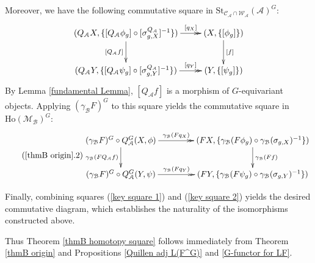 \documentclass[12pt,twoside]{amsart}
\theoremstyle{bfupright head,slanted body}
\theoremstyle{bfupright head,upright body}
\theoremstyle{fixed bf head,slanted body}
\theoremstyle{fixed bf head,upright body}
\theoremstyle{numbered paragraph}
\newenvironment{prf*}[1][Proof]{%
  \begin{proof}[\bf #1]
    \setcounter{equation}{0}
    \renewcommand{\theequation}{\arabic{equation}}}
  {\end{proof}
}
\numberwithin{equation}{res}
\newcommand{\calC}{\mathcal{C}}
\newcommand{\calW}{\mathcal{W}}
\newcommand{\calA}{\mathcal{A}}
\newcommand{\calB}{\mathcal{B}}
\newcommand{\calM}{\mathcal{M}}
\newcommand{\Ho}{\mathrm{Ho}}
\newcommand{\St}{\mathrm{St}}
\begin{document}
\begin{prf*}
Moreover, we have the following commutative square in $\St_{\calC_\calA \cap \calW_\calA}(\calA)^G$:
\[
\xymatrix{
   (Q_\calA X, \{[Q_\calA \phi_g] \circ [\sigma^{Q_\calA}_{g, X}]^{-1}\})
\ar[d]_{[Q_\calA f]}  \ar@{->>}[r]^-{[q_X]}
&  (X, \{[\phi_g]\})
\ar[d]^-{[f]}               \\
   (Q_\calA Y, \{[Q_\calA \psi_g] \circ [\sigma^{Q_\calA}_{g, Y}]^{-1}\})
\ar@{->>}[r]^-{[q_Y]}
&  (Y, \{[\psi_g]\})                                            }
\]
By Lemma \ref{fundamental Lemma}, $[Q_\calA f]$ is a morphism of $G$-equivariant objects.
Applying $(\gamma_\calB F)^G$ to this square yields the commutative square in $\Ho(\calM_\calB)^G$:
\begin{equation*} \label{key square 2} \tag{\ref{thmB origin}.2}
\begin{gathered}
\xymatrix@C=1.5CM{
   (\gamma_\calB F)^G \circ Q_\calA^G(X, \phi)
\ar@{->>}[r]^-{\gamma_\calB(F q_X)}
\ar[d]_-{\gamma_\calB(F Q_\calA f)}
&  (FX, \{\gamma_\calB(F \phi_g) \circ \gamma_\calB(\sigma_{g, X})^{-1}\})
\ar[d]^-{\gamma_\calB(F f)}                   \\
   (\gamma_\calB F)^G \circ Q_\calA^G(Y, \psi)
\ar@{->>}[r]^-{\gamma_\calB(F q_Y)}
&  (FY, \{\gamma_\calB(F \psi_g) \circ \gamma_\calB(\sigma_{g, Y})^{-1}\})
}
\end{gathered}
\end{equation*}

Finally, combining squares (\ref{key square 1}) and (\ref{key square 2}) yields the desired commutative diagram, which establishes the naturality of the isomorphisms constructed above.
\end{prf*}

Thus Theorem \ref{thmB homotopy square} follows immediately from Theorem \ref{thmB origin} and Propositions \ref{Quillen adj L(F^G)} and \ref{G-functor for LF}.
\end{document}
